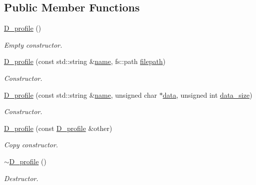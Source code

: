 \subsection*{Public Member Functions}
\begin{DoxyCompactItemize}
\item 
\hyperlink{class_photo_finish_1_1_d__profile_a5d2c843605849d4fe1a7e142bec84016}{D\+\_\+profile} ()
\begin{DoxyCompactList}\small\item\em Empty constructor. \end{DoxyCompactList}\item 
\hyperlink{class_photo_finish_1_1_d__profile_ab5b6dfde7c76fad1a4598a81800dc739}{D\+\_\+profile} (const std\+::string \&\hyperlink{class_photo_finish_1_1_d__profile_a7fd0fdc344ac49bb1bea312ef63f554c}{name}, fs\+::path \hyperlink{class_photo_finish_1_1_d__profile_aeacae9a94f4ecc6dabc4810a86e642fc}{filepath})
\begin{DoxyCompactList}\small\item\em Constructor. \end{DoxyCompactList}\item 
\hyperlink{class_photo_finish_1_1_d__profile_a3e1e0feb533ad141de8bfd071ecfb6af}{D\+\_\+profile} (const std\+::string \&\hyperlink{class_photo_finish_1_1_d__profile_a7fd0fdc344ac49bb1bea312ef63f554c}{name}, unsigned char $\ast$\hyperlink{class_photo_finish_1_1_d__profile_ab791e89b8333a60a13cdbb1b9579291c}{data}, unsigned int \hyperlink{class_photo_finish_1_1_d__profile_ab0907773b818b9d19c47e5aa4558b476}{data\+\_\+size})
\begin{DoxyCompactList}\small\item\em Constructor. \end{DoxyCompactList}\item 
\hyperlink{class_photo_finish_1_1_d__profile_a5b840e8fc4a0550a8c49e72e93e40463}{D\+\_\+profile} (const \hyperlink{class_photo_finish_1_1_d__profile}{D\+\_\+profile} \&other)
\begin{DoxyCompactList}\small\item\em Copy constructor. \end{DoxyCompactList}\item 
\hyperlink{class_photo_finish_1_1_d__profile_a3d62633c6030dcae01e7a63760a83c77}{$\sim$\+D\+\_\+profile} ()
\begin{DoxyCompactList}\small\item\em Destructor. \end{DoxyCompactList}\item 

\end{DoxyCompactItemize}
